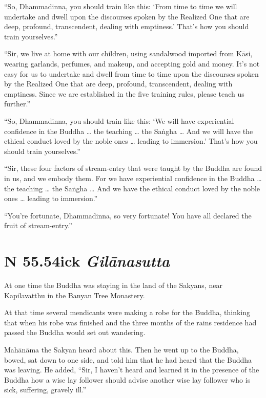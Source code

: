 \documentclass[12pt,openany]{book}%
\newcommand*{\suttatitleacronym}[1]{\smaller[2]{#1}\vspace*{.3em}}
\newcommand*{\suttatitletranslation}[1]{\linebreak{#1}}
\newcommand*{\suttatitleroot}[1]{\linebreak\smaller[2]\itshape{#1}}
\newcommand*{\tocacronym}[1]{\hspace*{-3.3em}{#1}\quad}
\newcommand*{\toctranslation}[1]{#1}
\newcommand*{\tocroot}[1]{(\textit{#1})}
\begin{document}
“So, Dhammadinna, you should train like this: ‘From time to time we will undertake and dwell upon the discourses spoken by the Realized One that are deep, profound, transcendent, dealing with emptiness.’ That’s how you should train yourselves.” 

“Sir, we live at home with our children, using sandalwood imported from \textsanskrit{Kāsi}, wearing garlands, perfumes, and makeup, and accepting gold and money. It’s not easy for us to undertake and dwell from time to time upon the discourses spoken by the Realized One that are deep, profound, transcendent, dealing with emptiness. Since we are established in the five training rules, please teach us further.” 

“So, Dhammadinna, you should train like this: ‘We will have experiential confidence in the Buddha … the teaching … the \textsanskrit{Saṅgha} … And we will have the ethical conduct loved by the noble ones … leading to immersion.’ That’s how you should train yourselves.” 

“Sir, these four factors of stream-entry that were taught by the Buddha are found in us, and we embody them. For we have experiential confidence in the Buddha … the teaching … the \textsanskrit{Saṅgha} … And we have the ethical conduct loved by the noble ones … leading to immersion.” 

“You’re fortunate, Dhammadinna, so very fortunate! You have all declared the fruit of stream-entry.” 

%
\section*{{\suttatitleacronym SN 55.54}{\suttatitletranslation Sick }{\suttatitleroot Gilānasutta}}
\addcontentsline{toc}{section}{\tocacronym{SN 55.54} \toctranslation{Sick } \tocroot{Gilānasutta}}

At one time the Buddha was staying in the land of the Sakyans, near Kapilavatthu in the Banyan Tree Monastery. 

At that time several mendicants were making a robe for the Buddha, thinking that when his robe was finished and the three months of the rains residence had passed the Buddha would set out wandering. 

\textsanskrit{Mahānāma} the Sakyan heard about this. Then he went up to the Buddha, bowed, sat down to one side, and told him that he had heard that the Buddha was leaving. He added, “Sir, I haven’t heard and learned it in the presence of the Buddha how a wise lay follower should advise another wise lay follower who is sick, suffering, gravely ill.” 
\end{document}
